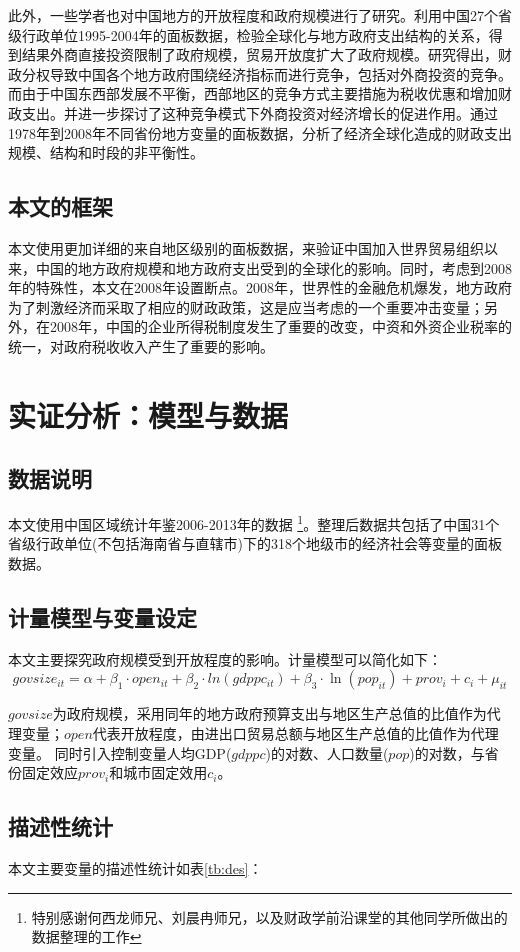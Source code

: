 \documentclass[10pt]{article}
\begin{document}
此外，一些学者也对中国地方的开放程度和政府规模进行了研究。\cite{cai2008}利用中国27个省级行政单位1995-2004年的面板数据，检验全球化与地方政府支出结构的关系，得到结果外商直接投资限制了政府规模，贸易开放度扩大了政府规模。\cite{wang2007}研究得出，财政分权导致中国各个地方政府围绕经济指标而进行竞争，包括对外商投资的竞争。而由于中国东西部发展不平衡，西部地区的竞争方式主要措施为税收优惠和增加财政支出。并进一步探讨了这种竞争模式下外商投资对经济增长的促进作用。\cite{sheng2010}通过1978年到2008年不同省份地方变量的面板数据，分析了经济全球化造成的财政支出规模、结构和时段的非平衡性。
\subsection{本文的框架}
本文使用更加详细的来自地区级别的面板数据，来验证中国加入世界贸易组织以来，中国的地方政府规模和地方政府支出受到的全球化的影响。同时，考虑到2008年的特殊性，本文在2008年设置断点。2008年，世界性的金融危机爆发，地方政府为了刺激经济而采取了相应的财政政策，这是应当考虑的一个重要冲击变量；另外，在2008年，中国的企业所得税制度发生了重要的改变，中资和外资企业税率的统一，对政府税收收入产生了重要的影响。

\section{实证分析：模型与数据}
\subsection{数据说明}
本文使用中国区域统计年鉴2006-2013年的数据
\footnote{特别感谢何西龙师兄、刘晨冉师兄，以及财政学前沿课堂的其他同学所做出的数据整理的工作}。整理后数据共包括了中国31个省级行政单位(不包括海南省与直辖市)下的318个地级市的经济社会等变量的面板数据。
\subsection{计量模型与变量设定}
本文主要探究政府规模受到开放程度的影响。计量模型可以简化如下：
$$ govsize_{it} = \alpha + \beta_1 \cdot open_{it} + \beta_2 \cdot ln(gdppc_{it}) + \beta_3 \cdot \ln(pop_{it}) + prov_{i} +c_i + \mu_{it}$$


$govsize$为政府规模，采用同年的地方政府预算支出与地区生产总值的比值作为代理变量；$open$代表开放程度，由进出口贸易总额与地区生产总值的比值作为代理变量。
同时引入控制变量人均GDP($gdppc$)的对数、人口数量($pop$)的对数，与省份固定效应$prov_i$和城市固定效用$c_i$。

\subsection{描述性统计}
本文主要变量的描述性统计如表\ref{tb:des}：
\end{document}
